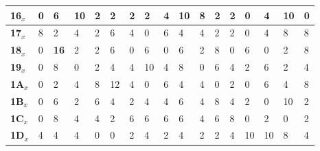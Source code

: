 \begin{longtable}[c]{|l|l|l|l|l|l|l|l|l|l|l|l|l|l|l|l|l|}
\textbf{16$_x$} & 0              & 6              & 10             & 2              & 2              & 2              & 2              & 4              & 10             & 8              & 2              & 2              & 0              & 4              & 10             & 0              \\ \hline
\textbf{17$_x$} & 8              & 2              & 4              & 2              & 6              & 4              & 0              & 6              & 4              & 4              & 2              & 2              & 0              & 4              & 8              & 8              \\ \hline
\textbf{18$_x$} & 0              & \textbf{16}             & 2              & 2              & 6              & 0              & 6              & 0              & 6              & 2              & 8              & 0              & 6              & 0              & 2              & 8              \\ \hline
\textbf{19$_x$} & 0              & 8              & 0              & 2              & 4              & 4              & 10             & 4              & 8              & 0              & 6              & 4              & 2              & 6              & 2              & 4              \\ \hline
\textbf{1A$_x$} & 0              & 2              & 4              & 8              & 12             & 4              & 0              & 6              & 4              & 4              & 0              & 2              & 0              & 6              & 4              & 8              \\ \hline
\textbf{1B$_x$} & 0              & 6              & 2              & 6              & 4              & 2              & 4              & 4              & 6              & 4              & 8              & 4              & 2              & 0              & 10             & 2              \\ \hline
\textbf{1C$_x$} & 0              & 8              & 4              & 4              & 2              & 6              & 6              & 6              & 6              & 4              & 6              & 8              & 0              & 2              & 0              & 2              \\ \hline
\textbf{1D$_x$} & 4              & 4              & 4              & 0              & 0              & 2              & 4              & 2              & 4              & 2              & 2              & 4              & 10             & 10             & 8              & 4              \\ \hline

\end{longtable}
